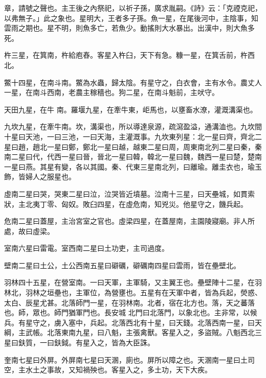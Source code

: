 \begin{pinyinscope}
 章，請號之聲也。主王後之內祭祀，以祈子孫，廣求胤嗣。《詩》云：「克禋克祀，以弗無子。」此之象也。星明大，王者多子孫。魚一星，在尾後河中，主陰事，知雲雨之期也。星不明，則魚多亡，若魚少。動搖則大水暴出。出漢中，則大魚多死。



 杵三星，在箕南，杵給庖舂。客星入杵臼，天下有急。糠一星，在箕舌前，杵西北。



 鱉十四星，在南斗南。鱉為水蟲，歸太陰。有星守之，白衣會，主有水令。農丈人一星，在南斗西南，老農主稼穡也。狗二星，在南斗魁前，主吠守。



 天田九星，在牛
 南。羅堰九星，在牽牛東，岠馬也，以壅畜水潦，灌溉溝渠也。



 九坎九星，在牽牛南。坎，溝渠也，所以導達泉源，疏瀉盈溢，通溝洫也。九坎間十星曰天池，一曰三池，一曰天海，主灌溉事。九坎東列星：北一星曰齊，齊北二星曰趙，趙北一星曰鄭，鄭北一星曰越，越東二星曰周，周東南北列二星曰秦，秦南二星曰代，代西一星曰晉，晉北一星曰韓，韓北一星曰魏，魏西一星曰楚，楚南一星曰燕。其星有變，各以其國。秦、代東三星南北列，曰離瑜。離圭衣也，瑜玉飾，皆婦人之服星也。



 虛南二星曰哭，哭東二星曰泣，泣哭皆近墳墓。泣南十三星，曰天壘城，如貫索
 狀，主北夷丁零、匈奴。敗臼四星，在虛危南，知兇災。他星守之，饑兵起。



 危南二星曰蓋屋，主治宮室之官也。虛梁四星，在蓋屋南，主園陵寢廟。非人所處，故曰虛梁。



 室南六星曰雷電。室西南二星曰土功吏，主司過度。



 壁南二星曰土公，土公西南五星曰礔礪，礔礪南四星曰雲雨，皆在壘壁北。



 羽林四十五星，在營室南。一曰天軍，主軍騎，又主翼王也。壘壁陣十二星，在羽林北，羽林之垣壘也，主軍位，為營壅也。五星有在天軍中者，皆為兵起，熒惑、太白、辰星尤甚。北落師門一星，在羽林南。北者，宿在北方也。落，天之蕃落也。師，眾也。師門猶軍門也。長安城
 北門曰北落門，以象北也。主非常，以候兵。有星守之，虜入塞中，兵起。北落西北有十星，曰天錢。北落西南一星，曰天綱，主武帳。北落東南九星，曰八魁，主張禽獸。客星入之，多盜賊。八魁西北三星曰鈇質，一曰鈇鉞。有星入之，皆為大臣誅。



 奎南七星曰外屏。外屏南七星曰天溷，廁也。屏所以障之也。天溷南一星曰土司空，主水土之事故，又知禍殃也。客星入之，多土功，天下大疾。




\end{pinyinscope}
